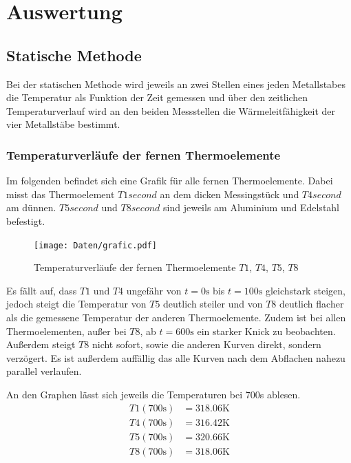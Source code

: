 \newpage
\section{Auswertung}
    \subsection{Statische Methode}
        Bei der statischen Methode wird jeweils an zwei Stellen eines jeden Metallstabes die Temperatur als Funktion der Zeit gemessen und über den zeitlichen
        Temperaturverlauf wird an den beiden Messstellen die Wärmeleitfähigkeit der vier Metallstäbe bestimmt.

        \subsubsection{Temperaturverläufe der fernen Thermoelemente}
        Im folgenden befindet sich eine Grafik für alle fernen Thermoelemente. Dabei misst das Thermoelement $T1 \si{second}$ an dem dicken Messingstück und $T4 \si{second}$ am dünnen. $T5 \si{second}$ und $T8 \si{second}$ sind
        jeweils am Aluminium und Edelstahl befestigt.

        \begin{figure}
               \centering
               \texttt{[image: Daten/grafic.pdf]}
               \caption{Temperaturverläufe der fernen Thermoelemente $T1$, $T4$, $T5$, $T8$}
               \label{fig:static_far}
        \end{figure}

        Es fällt auf, dass $T1$ und $T4$ ungefähr von $t = 0 \si{\second}$ bis $t = 100 \si{\second}$ gleichstark steigen, jedoch steigt die Temperatur von $T5$ deutlich steiler und von $T8$ deutlich 
        flacher als die gemessene Temperatur der anderen Thermoelemente.
        Zudem ist bei allen Thermoelementen, außer bei $T8$, ab $t = 600 \si{\second}$ ein starker Knick zu beobachten. Außerdem steigt $T8$ nicht sofort, sowie die anderen Kurven direkt, sondern verzögert. 
        Es ist außerdem auffällig das alle Kurven nach dem Abflachen nahezu parallel verlaufen.


        An den Graphen lässt sich jeweils die Temperaturen bei 700s ablesen.
        \begin{align}
         T1(700 \si{\second}) &=  318.06 \si{\kelvin} \\ 
         T4(700 \si{\second}) &=  316.42 \si{\kelvin} \\
         T5(700 \si{\second}) &=  320.66 \si{\kelvin} \\
         T8(700 \si{\second}) &=  318.06 \si{\kelvin} 
        \end{align}

